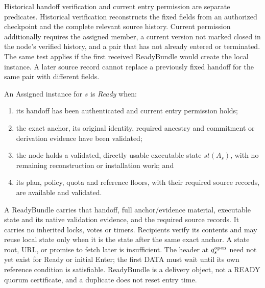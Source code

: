 Historical handoff verification and current entry permission are
separate predicates. Historical verification reconstructs the fixed
fields from an authorized checkpoint and the complete relevant source
history. Current permission additionally requires the assigned member,
a current version not marked closed in the node's verified history,
and a pair that has not already entered or terminated. The same test
applies if the first received ReadyBundle would create the local
instance. A later source record cannot replace a previously fixed
handoff for the same pair with different fields.

\begin{definition}[Ready]
\label{def:ready}
An Assigned instance for $s$ is \emph{Ready} when:
\begin{enumerate}[label=(\roman*)]
\item its handoff has been authenticated and current entry permission
holds;
\item the exact anchor, its original identity, required ancestry and
commitment or derivation evidence have been validated;
\item the node holds a validated, directly usable executable state
$\mathit{st}(A_s)$, with no remaining reconstruction or installation
work; and
\item its plan, policy, quota and reference floors, with their required
source records, are available and validated.
\end{enumerate}
\end{definition}
A ReadyBundle carries that handoff, full anchor/evidence material,
executable state and its native validation evidence, and the required
source records. It carries no inherited locks, votes or timers.
Recipients verify its contents and may reuse local state only when it
is the state after the same exact anchor. A state root, URL, or promise
to fetch later is insufficient. The header at $q_s^{\rm open}$ need not
yet exist for Ready or initial Enter; the first DATA must wait until
its own reference condition is satisfiable. ReadyBundle is a delivery
object, not a READY quorum certificate, and a duplicate does not reset
entry time.

